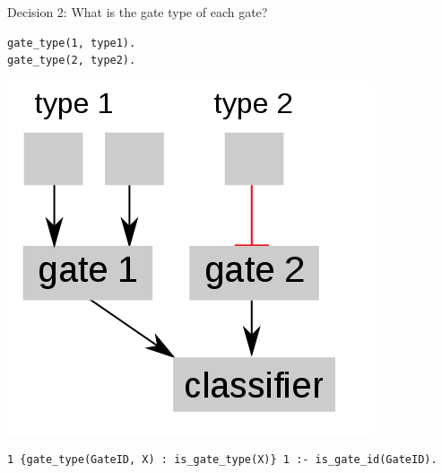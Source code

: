 \documentclass[10pt,dvipsnames]{beamer}
\begin{document}
\begin{frame}[fragile]{Decision 2: What is the gate type of each gate?}
\small
\begin{minipage}{0.45\textwidth}
\color{my_example_color}
\begin{verbatim}
gate_type(1, type1).
gate_type(2, type2).
\end{verbatim}
\end{minipage}
\hfill
\begin{minipage}{0.45\textwidth}
\begin{center}
\includegraphics[scale=0.3]{exp2.png}
\end{center}
\end{minipage}
\vspace{1.3cm}
\begin{verbatim}
1 {gate_type(GateID, X) : is_gate_type(X)} 1 :- is_gate_id(GateID).
\end{verbatim}
\end{frame}
\end{document}
